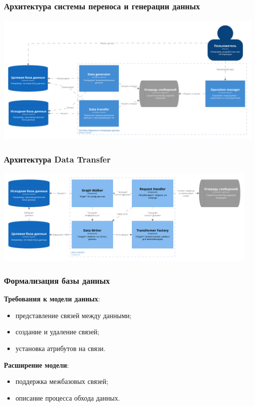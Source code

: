 \documentclass[pdf, hyperref={unicode}, aspectratio=169]{beamer}
\begin{document}
\begin{frame}
\frametitle{Архитектура системы переноса и генерации данных}
	\begin{center}
		\includegraphics[height = 6.5cm]{img/structurizr-Containers-cut}
	\end{center}
\end{frame}


\begin{frame}
\frametitle{Архитектура Data Transfer}
	\begin{center}
		\includegraphics[width = 13cm]{img/structurizr-DataTransferComponents-cut}
	\end{center}
\end{frame}


\begin{frame}
\frametitle{Формализация базы данных}
	\textbf{Требования к модели данных}:
	\begin{itemize}
		\item представление связей между данными;
		\item создание и удаление связей;
		\item установка атрибутов на связи.
	\end{itemize}

	\textbf{Расширение модели}:
	\begin{itemize}
		\item поддержка межбазовых связей;
		\item описание процесса обхода данных.
	\end{itemize}
\end{frame}
\end{document}
